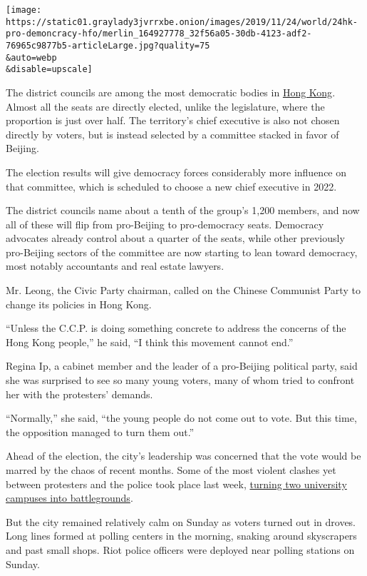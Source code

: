 \texttt{[image: https://static01.graylady3jvrrxbe.onion/images/2019/11/24/world/24hk-pro-demoncracy-hfo/merlin\_164927778\_32f56a05-30db-4123-adf2-76965c9877b5-articleLarge.jpg?quality=75\\\&auto=webp\\\&disable=upscale]}

The district councils are among the most democratic bodies in
\href{https://www.nytimes3xbfgragh.onion/2019/11/25/world/asia/hong-kong-election-winners.html}{Hong
Kong}. Almost all the seats are directly elected, unlike the
legislature, where the proportion is just over half. The territory's
chief executive is also not chosen directly by voters, but is instead
selected by a committee stacked in favor of Beijing.

The election results will give democracy forces considerably more
influence on that committee, which is scheduled to choose a new chief
executive in 2022.

The district councils name about a tenth of the group's 1,200 members,
and now all of these will flip from pro-Beijing to pro-democracy seats.
Democracy advocates already control about a quarter of the seats, while
other previously pro-Beijing sectors of the committee are now starting
to lean toward democracy, most notably accountants and real estate
lawyers.

Mr. Leong, the Civic Party chairman, called on the Chinese Communist
Party to change its policies in Hong Kong.

``Unless the C.C.P. is doing something concrete to address the concerns
of the Hong Kong people,'' he said, ``I think this movement cannot
end.''

Regina Ip, a cabinet member and the leader of a pro-Beijing political
party, said she was surprised to see so many young voters, many of whom
tried to confront her with the protesters' demands.

``Normally,'' she said, ``the young people do not come out to vote. But
this time, the opposition managed to turn them out.''

Ahead of the election, the city's leadership was concerned that the vote
would be marred by the chaos of recent months. Some of the most violent
clashes yet between protesters and the police took place last week,
\href{https://www.nytimes3xbfgragh.onion/interactive/2019/11/18/world/asia/hong-kong-protest-universities.html}{turning
two university campuses into battlegrounds}.

But the city remained relatively calm on Sunday as voters turned out in
droves. Long lines formed at polling centers in the morning, snaking
around skyscrapers and past small shops. Riot police officers were
deployed near polling stations on Sunday.

